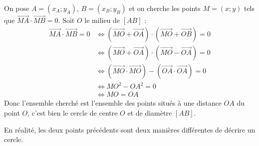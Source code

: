 	\begin{demonstration}
		\contentwidth[big]
		On pose $A = (x_A; y_A)$, $B = (x_B; y_B)$ et on cherche les points $M = (x; y)$ tels que $\overrightarrow{MA} \cdot \overrightarrow{MB} = 0$.
		\newpar
		Soit $O$ le milieu de $[AB]$ :
		\begin{align*}
			\overrightarrow{MA} \cdot \overrightarrow{MB} = 0 &\iff (\overrightarrow{MO} + \overrightarrow{OA}) \cdot (\overrightarrow{MO} + \overrightarrow{OB}) = 0 \\
			&\iff (\overrightarrow{MO} + \overrightarrow{OA}) \cdot (\overrightarrow{MO} - \overrightarrow{OA}) = 0 \\
			&\iff (\overrightarrow{MO} \cdot \overrightarrow{MO}) - (\overrightarrow{OA} \cdot \overrightarrow{OA}) = 0 \\
			&\iff MO^2 - OA^2 = 0 \\
			&\iff MO = OA
		\end{align*}
		Donc l'ensemble cherché est l'ensemble des points situés à une distance $OA$ du point $O$, c'est bien le cercle de centre $O$ et de diamètre $[AB]$.
	\end{demonstration}

	En réalité, les deux points précédents sont deux manières différentes de décrire un cercle.

